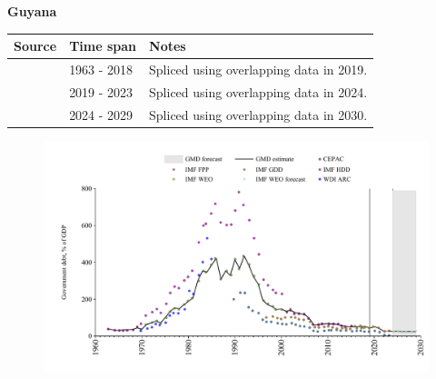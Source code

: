 \documentclass[12pt,a4paper,landscape]{article}
\begin{document}
\begin{adjustbox}{max totalsize={\paperwidth}{\paperheight},center}
\begin{minipage}[t][\textheight][t]{\textwidth}
\vspace*{0.5cm}
{}
\begin{center}
{\Large\bfseries Guyana}
\end{center}
\vspace{0.5cm}
\begin{table}[H]
\centering
\small
\begin{tabular}{|l|l|l|}
\hline
\textbf{Source} & \textbf{Time span} & \textbf{Notes} \\
\hline
\rowcolor{white}\cite{IMF_GDD}& 1963 - 2018 &Spliced using overlapping data in 2019.\\
\rowcolor{lightgray}\cite{IMF_FPP}& 2019 - 2023 &Spliced using overlapping data in 2024.\\
\rowcolor{white}\cite{IMF_WEO_forecast}& 2024 - 2029 &Spliced using overlapping data in 2030.\\
\hline
\end{tabular}
\end{table}
\begin{figure}[H]
\centering
\includegraphics[width=\textwidth,height=0.6\textheight,keepaspectratio]{graphs/GUY_govdebt_GDP.pdf}
\end{figure}
\end{minipage}
\end{adjustbox}
\end{document}
